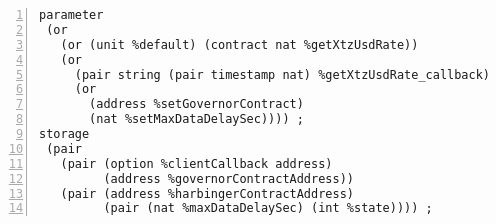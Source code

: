 
\begin{lstlisting}[float,captionpos=b,caption={Kolibri oracle contract},label={lst:kolibri-oracle-contract},numbers=left]
parameter
 (or
   (or (unit %default) (contract nat %getXtzUsdRate))
   (or
     (pair string (pair timestamp nat) %getXtzUsdRate_callback)
     (or
       (address %setGovernorContract) 
       (nat %setMaxDataDelaySec)))) ;
storage
 (pair
   (pair (option %clientCallback address) 
         (address %governorContractAddress))
   (pair (address %harbingerContractAddress) 
         (pair (nat %maxDataDelaySec) (int %state)))) ;
\end{lstlisting}

